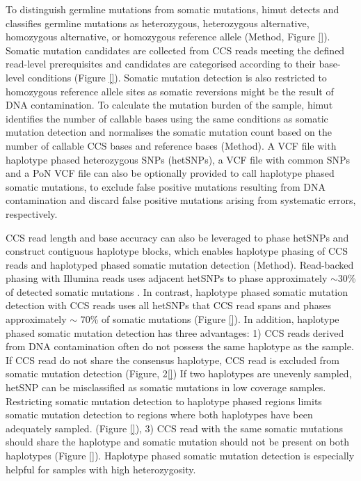 To distinguish germline mutations from somatic mutations, himut detects and classifies germline mutations as heterozygous, heterozygous alternative, homozygous alternative, or homozygous reference allele (Method, Figure \ref{}). Somatic mutation candidates are collected from CCS reads meeting the defined read-level prerequisites and candidates are categorised according to their base-level conditions (Figure \ref{}). Somatic mutation detection is also restricted to homozygous reference allele sites as somatic reversions might be the result of DNA contamination. To calculate the mutation burden of the sample, himut identifies the number of callable bases using the same conditions as somatic mutation detection and normalises the somatic mutation count based on the number of callable CCS bases and reference bases (Method). A VCF file with haplotype phased heterozygous SNPs (hetSNPs), a VCF file with common SNPs and a PoN VCF file can also be optionally provided to call haplotype phased somatic mutations, to exclude false positive mutations resulting from DNA contamination and discard false positive mutations arising from systematic errors, respectively. 

CCS read length and base accuracy can also be leveraged to phase hetSNPs and construct contiguous haplotype blocks, which enables haplotype phasing of CCS reads and haplotyped phased somatic mutation detection (Method). Read-backed phasing with Illumina reads uses adjacent hetSNPs to phase approximately $\sim$30\% of detected somatic mutations \cite{}. In contrast, haplotype phased somatic mutation detection with CCS reads uses all hetSNPs that CCS read spans and phases approximately $\sim$ 70\% of somatic mutations (Figure \ref{}). In addition, haplotype phased somatic mutation detection has three advantages: 1) CCS reads derived from DNA contamination often do not possess the same haplotype as the sample. If CCS read do not share the consensus haplotype, CCS read is excluded from somatic mutation detection (Figure, 2\ref{}) If two haplotypes are unevenly sampled, hetSNP can be misclassified as somatic mutations in low coverage samples. Restricting somatic mutation detection to haplotype phased regions limits somatic mutation detection to regions where both haplotypes have been adequately sampled. (Figure \ref{}), 3) CCS read with the same somatic mutations should share the haplotype and somatic mutation should not be present on both haplotypes (Figure \ref{}). Haplotype phased somatic mutation detection is especially helpful for samples with high heterozygosity.

